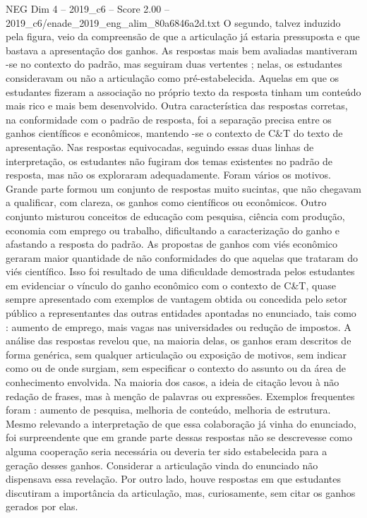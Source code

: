 \begin{textsample}{NEG Dim 4 – 2019\_c6 – Score 2.00 – 2019\_c6/enade\_2019\_eng\_alim\_80a6846a2d.txt}
O segundo, talvez induzido pela figura, veio da compreensão de que a articulação já estaria pressuposta e que bastava a apresentação dos ganhos.
As respostas mais bem avaliadas mantiveram -se no contexto do padrão, mas seguiram duas vertentes ; nelas, os estudantes consideravam ou não a articulação como pré-estabelecida.
Aquelas em que os estudantes fizeram a associação no próprio texto da resposta tinham um conteúdo mais rico e mais bem desenvolvido.
Outra característica das respostas corretas, na conformidade com o padrão de resposta, foi a separação precisa entre os ganhos científicos e econômicos, mantendo -se o contexto de C\&T do texto de apresentação.
Nas respostas equivocadas, seguindo essas duas linhas de interpretação, os estudantes não fugiram dos temas existentes no padrão de resposta, mas não os exploraram adequadamente.
Foram vários os motivos.
Grande parte formou um conjunto de respostas muito sucintas, que não chegavam a qualificar, com clareza, os ganhos como científicos ou econômicos.
Outro conjunto misturou conceitos de educação com pesquisa, ciência com produção, economia com emprego ou trabalho, dificultando a caracterização do ganho e afastando a resposta do padrão.
As propostas de ganhos com viés econômico geraram maior quantidade de não conformidades do que aquelas que trataram do viés científico.
Isso foi resultado de uma dificuldade demostrada pelos estudantes em evidenciar o vínculo do ganho econômico com o contexto de C\&T, quase sempre apresentado com exemplos de vantagem obtida ou concedida pelo setor público a representantes das outras entidades apontadas no enunciado, tais como : aumento de emprego, mais vagas nas universidades ou redução de impostos.
A análise das respostas revelou que, na maioria delas, os ganhos eram descritos de forma genérica, sem qualquer articulação ou exposição de motivos, sem indicar como ou de onde surgiam, sem especificar o contexto do assunto ou da área de conhecimento envolvida.
Na maioria dos casos, a ideia de citação levou à não redação de frases, mas à menção de palavras ou expressões.
Exemplos frequentes foram : aumento de pesquisa, melhoria de conteúdo, melhoria de estrutura.
Mesmo relevando a interpretação de que essa colaboração já vinha do enunciado, foi surpreendente que em grande parte dessas respostas não se descrevesse como alguma cooperação seria necessária ou deveria ter sido estabelecida para a geração desses ganhos.
Considerar a articulação vinda do enunciado não dispensava essa revelação.
Por outro lado, houve respostas em que estudantes discutiram a importância da articulação, mas, curiosamente, sem citar os ganhos gerados por elas.

\end{textsample}
